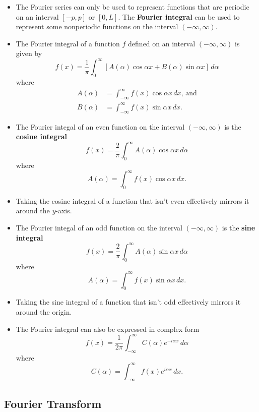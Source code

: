 \documentclass{article}
\begin{document}
\begin{itemize}
  \item The Fourier series can only be used to represent functions that are periodic on an interval $[-p, p]$ or $[0, L]$. The \textbf{Fourier integral} can be used to represent some nonperiodic functions on the interval $(-\infty, \infty)$.

  \item The Fourier integral of a function $f$ defined on an interval $(-\infty, \infty)$ is given by \[f(x) = \frac{1}{\pi} \int_0^\infty [A(\alpha) \cos \alpha x + B(\alpha) \sin \alpha x] \,d \alpha\] where \begin{align*}
          A(\alpha) & = \int_{-\infty}^\infty f(x) \cos \alpha x \,d x \text{, and} \\
          B(\alpha) & = \int_{-\infty}^\infty f(x) \sin \alpha x \,d x.
        \end{align*}

  \item The Fourier integal of an even function on the interval $(-\infty, \infty)$ is the \textbf{cosine integral} \[f(x) = \frac{2}{\pi} \int_0^\infty A(\alpha) \cos \alpha x \,d \alpha\] where \[A(\alpha) = \int_0^\infty f(x) \cos \alpha x \,d x.\]

  \item Taking the cosine integral of a function that isn't even effectively mirrors it around the $y$-axis.

  \item The Fourier integal of an odd function on the interval $(-\infty, \infty)$ is the \textbf{sine integral} \[f(x) = \frac{2}{\pi} \int_0^\infty A(\alpha) \sin \alpha x \,d \alpha\] where \[A(\alpha) = \int_0^\infty f(x) \sin \alpha x \,d x.\]

  \item Taking the sine integral of a function that isn't odd effectively mirrors it around the origin.

  \item The Fourier integral can also be expressed in complex form \[f(x) = \frac{1}{2 \pi} \int_{-\infty}^\infty C(\alpha) e^{-i \alpha x} \,d \alpha\] where \[C(\alpha) = \int_{-\infty}^\infty f(x) e^{i \alpha x} \,d x.\]
\end{itemize}

\subsection{Fourier Transform}
\end{document}
